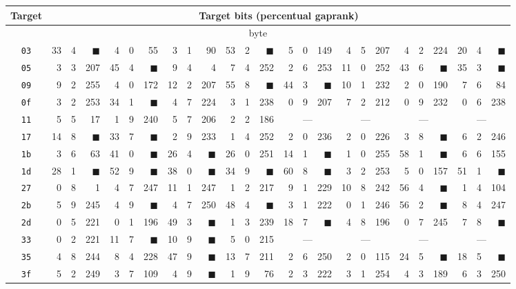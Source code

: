 \begin{tabular}{| c | r@{.} l@{\quad}r | r@{.} l@{\quad}r | r@{.} l@{\quad}r | r@{.} l@{\quad}r | r@{.} l@{\quad}r | r@{.} l@{\quad}r | r@{.} l@{\quad}r | r@{.} l@{\quad}r |}
	\hline
	Target & \multicolumn{24}{c|}{Target bits (percentual gap\quad rank)} \\
	\hline
	\hline
	\multicolumn{25}{|c|}{\nth{0} byte} \\
	\hline
	{\tt 03}&33&4&$\blacksquare$&4&0&55&3&1&90&53&2&$\blacksquare$&5&0&149&4&5&207&4&2&224&20&4&$\blacksquare$\\
	\hline
	{\tt 05}&3&3&207&45&4&$\blacksquare$&9&4&4&7&4&252&2&6&253&11&0&252&43&6&$\blacksquare$&35&3&$\blacksquare$\\
	\hline
	{\tt 09}&9&2&255&4&0&172&12&2&207&55&8&$\blacksquare$&44&3&$\blacksquare$&10&1&232&2&0&190&7&6&84\\
	\hline
	{\tt 0f}&3&2&253&34&1&$\blacksquare$&4&7&224&3&1&238&0&9&207&7&2&212&0&9&232&0&6&238\\
	\hline
	{\tt 11}&5&5&17&1&9&240&5&7&206&2&2&186&\multicolumn{3}{c|}{---}&\multicolumn{3}{c|}{---}&\multicolumn{3}{c|}{---}&\multicolumn{3}{c|}{---}\\
	\hline
	{\tt 17}&14&8&$\blacksquare$&33&7&$\blacksquare$&2&9&233&1&4&252&2&0&236&2&0&226&3&8&$\blacksquare$&6&2&246\\
	\hline
	{\tt 1b}&3&6&63&41&0&$\blacksquare$&26&4&$\blacksquare$&26&0&251&14&1&$\blacksquare$&1&0&255&58&1&$\blacksquare$&6&6&155\\
	\hline
	{\tt 1d}&28&1&$\blacksquare$&52&9&$\blacksquare$&38&0&$\blacksquare$&34&9&$\blacksquare$&60&8&$\blacksquare$&3&2&253&5&0&157&51&1&$\blacksquare$\\
	\hline
	{\tt 27}&0&8&1&4&7&247&11&1&247&1&2&217&9&1&229&10&8&242&56&4&$\blacksquare$&1&4&104\\
	\hline
	{\tt 2b}&5&9&245&4&9&$\blacksquare$&4&7&250&48&4&$\blacksquare$&3&1&222&0&1&246&56&2&$\blacksquare$&8&4&247\\
	\hline
	{\tt 2d}&0&5&221&0&1&196&49&3&$\blacksquare$&1&3&239&18&7&$\blacksquare$&4&8&196&0&7&245&7&8&$\blacksquare$\\
	\hline
	{\tt 33}&0&2&221&11&7&$\blacksquare$&10&9&$\blacksquare$&5&0&215&\multicolumn{3}{c|}{---}&\multicolumn{3}{c|}{---}&\multicolumn{3}{c|}{---}&\multicolumn{3}{c|}{---}\\
	\hline
	{\tt 35}&4&8&244&8&4&228&47&9&$\blacksquare$&13&7&211&2&6&250&2&0&115&24&5&$\blacksquare$&18&5&$\blacksquare$\\
	\hline
	{\tt 3f}&5&2&249&3&7&109&4&9&$\blacksquare$&1&9&76&2&3&222&3&1&254&4&3&189&6&3&250\\

\end{tabular}
